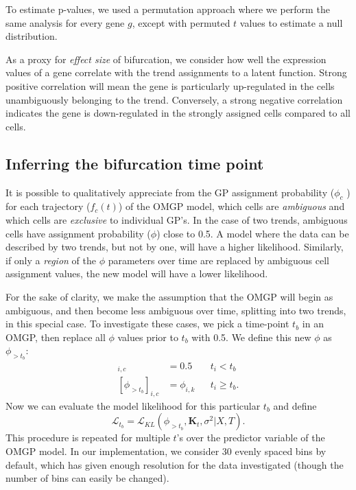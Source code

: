 To estimate p-values, we used a permutation approach where we perform the same analysis for every gene $ g $, except with permuted $ t $ values to estimate a null distribution.

As a proxy for \textit{effect size} of bifurcation, we consider how well the expression values of a gene correlate with the trend assignments to a latent function. Strong positive correlation will mean the gene is particularly up-regulated in the cells unambiguously belonging to the trend. Conversely, a strong negative correlation indicates the gene is down-regulated in the strongly assigned cells compared to all cells.

\subsection{Inferring the bifurcation time point}

It is possible to qualitatively appreciate from the GP assignment probability ($ \phi_c $ ) for each trajectory ($ f_c(t) $) of the OMGP model, which cells are \textit{ambiguous}  and which cells are \textit{exclusive} to individual GP's. In the case of two trends, ambiguous cells have assignment probability ($ \phi $) close to 0.5. A model where the data can be described by two trends, but not by one, will have a higher likelihood. Similarly, if only a \textit{region} of the $ \phi $ parameters over time are replaced by ambiguous cell assignment values, the new model will have a lower likelihood.

For the sake of clarity, we make the assumption that the OMGP will begin as ambiguous, and then become less ambiguous over time, splitting into two trends, in this special case. To investigate these cases, we pick a time-point $ t_b $ in an OMGP, then replace all $ \phi $ values prior to $ t_b $ with 0.5. We define this new $ \phi $ as $ \phi_{> t_b} $:
\begin{align*}
[\phi_{> t_b}]_{i,c} &= 0.5 & & t_i < t_b \\
[\phi_{> t_b}]_{i,c} &= \phi_{i,k} & & t_i \geq t_b.
\end{align*}
Now we can evaluate the model likelihood for this particular $ t_b $ and define
\[ \mathcal{L}_{t_b} = \mathcal{L}_{KL} (\phi_{> t_b}, \mathbf{K}_t, \sigma^2 | X, T ). \]
This procedure is repeated for multiple $ t $’s over the predictor variable of the OMGP model. In our implementation, we consider 30 evenly spaced bins by default, which has given enough resolution for the data investigated (though the number of bins can easily be changed).


